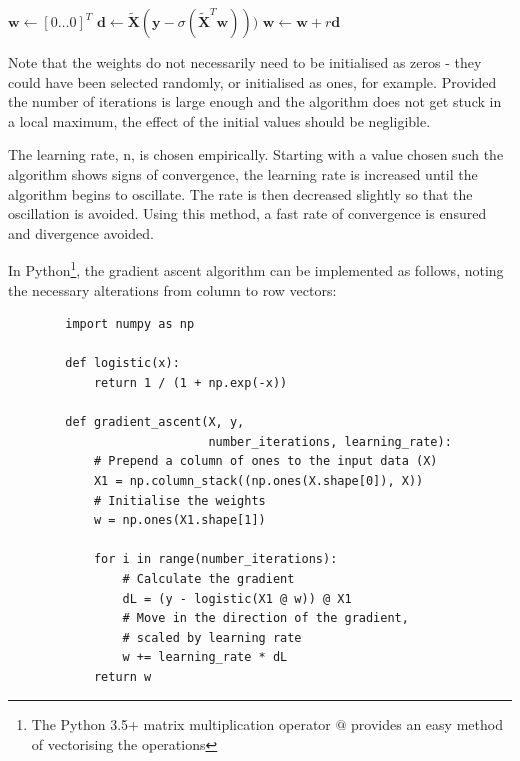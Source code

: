 \documentclass[a4paper]{article}
\begin{document}
    \begin{algorithmic}
            \State $\textbf{w} \gets [0 \dots 0]^T$ 
                \State $\textbf{d} \gets \tilde{\textbf{X}} (\textbf{y} - \sigma(\tilde{\textbf{X}}^T \textbf{w})))$ 
                \State $\textbf{w} \gets \textbf{w} + r\textbf{d} $ 
            \EndFor
        \EndProcedure
    \end{algorithmic}

    Note that the weights do not necessarily need to be initialised as zeros - they could have been selected randomly, or
    initialised as ones, for example. Provided the number of iterations is large enough and the algorithm does not get
    stuck in a local maximum, the effect of the initial values should be negligible.

    The learning rate, n, is chosen empirically. Starting with a value chosen such the algorithm shows signs
    of convergence, the learning rate is increased until the algorithm begins to oscillate. The rate is then decreased
    slightly so that the oscillation is avoided. Using this method, a fast rate of convergence is ensured and divergence
    avoided.

    In Python\footnote{The Python 3.5+ matrix multiplication operator $@$ provides an easy method of vectorising the
    operations}, the gradient ascent algorithm can be implemented as follows, noting the necessary alterations from
    column to row vectors:

    \begin{verbatim}
        import numpy as np

        def logistic(x):
            return 1 / (1 + np.exp(-x))

        def gradient_ascent(X, y,
                            number_iterations, learning_rate):
            # Prepend a column of ones to the input data (X)
            X1 = np.column_stack((np.ones(X.shape[0]), X))
            # Initialise the weights
            w = np.ones(X1.shape[1])

            for i in range(number_iterations):
                # Calculate the gradient
                dL = (y - logistic(X1 @ w)) @ X1
                # Move in the direction of the gradient,
                # scaled by learning rate
                w += learning_rate * dL
            return w
    \end{verbatim}
\end{document}
